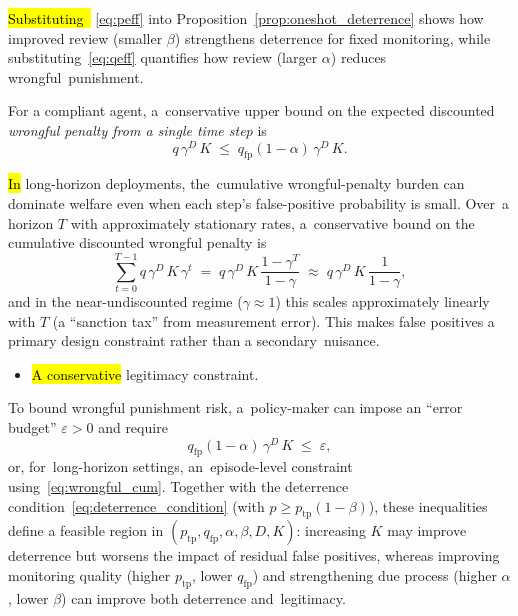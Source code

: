 \documentclass[mca,article,accept,pdftex,oneauthor]{Definitions/mdpi}
\begin{document}
\hl{Substituting~}%
\eqref{eq:peff} into Proposition~\ref{prop:oneshot_deterrence} shows how improved review (smaller $\beta$) strengthens deterrence for fixed monitoring, while substituting~\eqref{eq:qeff} quantifies how review (larger $\alpha$) reduces wrongful~punishment.

For a compliant agent, a~conservative upper bound on the expected discounted \emph{wrongful penalty from a single time step} is
\begin{equation}
\label{eq:wrongful_single}
q\,\gamma^{D}\,K \;\le\; q_{\mathrm{fp}}(1-\alpha)\,\gamma^{D}\,K.
\end{equation}

\hl{In} long-horizon deployments, the~cumulative wrongful-penalty burden can dominate welfare even when each step’s false-positive probability is small. Over~a horizon $T$ with approximately stationary rates, a~conservative bound on the cumulative discounted wrongful penalty is
\begin{equation}
\label{eq:wrongful_cum}
\sum_{t=0}^{T-1} q\,\gamma^{D}\,K\,\gamma^{t}
\;=\;
q\,\gamma^{D}\,K\,\frac{1-\gamma^{T}}{1-\gamma}
\;\approx\;
q\,\gamma^{D}\,K\,\frac{1}{1-\gamma},
\end{equation}
and in the near-undiscounted regime ($\gamma\approx 1$) this scales approximately linearly with $T$ (a ``sanction tax'' from measurement error). This makes false positives a primary design constraint rather than a secondary~nuisance.

\begin{itemize}[leftmargin=-0.5pt, label={}] %
\item {\hl{A conservative} legitimacy constraint.}
\end{itemize}

To bound wrongful punishment risk, a~policy-maker can impose an ``error budget'' $\varepsilon>0$ and require
\begin{equation}
\label{eq:legitimacy_constraint}
q_{\mathrm{fp}}(1-\alpha)\,\gamma^{D}\,K \;\le\; \varepsilon,
\end{equation}
or, for~long-horizon settings, an~episode-level constraint using~\eqref{eq:wrongful_cum}. Together with the deterrence condition~\eqref{eq:deterrence_condition} (with $p\ge p_{\mathrm{tp}}(1-\beta)$), these inequalities define a feasible region in $(p_{\mathrm{tp}},q_{\mathrm{fp}},\alpha,\beta,D,K)$: increasing $K$ may improve deterrence but worsens the impact of residual false positives, whereas improving monitoring quality (higher $p_{\mathrm{tp}}$, lower $q_{\mathrm{fp}}$) and strengthening due process (higher $\alpha$, lower $\beta$) can improve both deterrence and~legitimacy.
\end{document}
